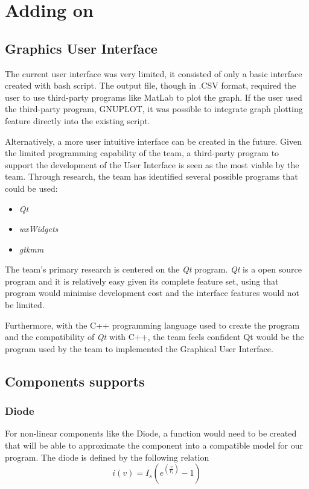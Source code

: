 \documentclass[12pt,a4paper]{article}
\begin{document}
\section{Adding on}
\subsection{Graphics User Interface}
The current user interface was very limited, it consisted of only a basic interface created
with bash script. The output file, though in .CSV format, required the user to 
use third-party programs like MatLab to plot the graph. If the user used the third-party
program, GNUPLOT, it was possible to integrate graph plotting feature directly into the existing 
script. 
\par 
Alternatively, a more user intuitive interface can be created in the future. Given the 
limited programming capability of the team, a third-party program to support the 
development of the User Interface is seen as the most viable by the team. Through research, the 
team has identified several possible programs that could be used:
\begin{itemize}
	\item \textit{Qt}
	\item \textit{wxWidgets}
	\item \textit{gtkmm}
\end{itemize}
The team's primary research is centered on the \textit{Qt} program. \textit{Qt} is a open
source program and it is relatively easy given its complete feature set, using that program
would minimise development cost and the interface features would not be limited.

Furthermore, with the C++ programming language used to create the program and the compatibility
of \textit{Qt} with C++, the team feels confident Qt would be the program used by the team
to implemented the Graphical User Interface.

\subsection{Components supports}
\subsubsection{Diode}
For non-linear components like the Diode, a function would need to be created that will be able to 
approximate the component into a compatible model for our program. The diode is defined by the 
following relation $$i(v)=I_s(e^{(\frac{v}{V_t})}-1)$$
\end{document}
